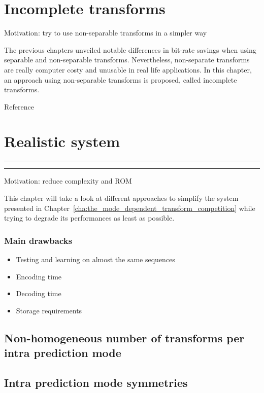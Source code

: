 \documentclass[11pt,a4paper,openright,twoside]{book}
\providecommand{\chaptertoc}{
	\startcontents[chapters]
	\hrule
	\vspace{1em}
	\printcontents[chapters]{}{1}{{\bf\large Contents}}
	\hrule
}
\numberwithin{equation}{section} %
\numberwithin{figure}{section} %
\numberwithin{table}{section} %
\begin{document}
\chapter{Incomplete transforms}
\label{cha:incomplete_transforms}

Motivation: try to use non-separable transforms in a simpler way

The previous chapters unveiled notable differences in bit-rate savings when
using separable and non-separable transforms.
Nevertheless, non-separate transforms are really computer costy and unusable
in real life applications.
In this chapter, an approach using non-separable transforms is proposed,
called incomplete transforms.

Reference~\cite{arrufat-15-inc-transforms}

\chapter{Realistic system}
\label{cha:realistic_system}
\chaptertoc

Motivation: reduce complexity and ROM

This chapter will take a look at different approaches to simplify the
system presented in
Chapter~\ref{cha:the_mode_dependent_transform_competition} while trying
to degrade its performances as least as possible.

\subsection{Main drawbacks}
\label{sub:main_drawbacks}

\begin{itemize}
	\item Testing and learning on almost the same sequences
	\item Encoding time
	\item Decoding time
	\item Storage requirements
\end{itemize}

\section{Non-homogeneous number of transforms per intra prediction mode}
\label{sec:non_homogeneous_number_of_transforms_per_intra_prediction_mode}

\section{Intra prediction mode symmetries}
\label{sec:intra_prediction_mode_symmetries}
\end{document}
